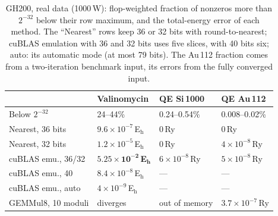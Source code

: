 \documentclass[conference]{IEEEtran}
\newcommand{\W}{\,W}
\newcommand{\Eh}{\,E$_\mathrm{h}$}
\newcommand{\Ry}{\,Ry}
\newcommand{\ee}[2]{#1{\times}10^{#2}}  %
\newcommand{\pct}{\%}
\begin{document}
\begin{table}[t]
\caption{GH200, real data (1000\W): flop-weighted fraction of nonzeros more than $2^{-32}$ below their row maximum, and the
total-energy error of each method. The ``Nearest'' rows keep 36 or 32 bits with round-to-nearest; cuBLAS emulation
with 36 and 32 bits uses five slices, with 40 bits six; auto: its automatic mode (at most 79 bits). The Au\,112
fraction comes from a two-iteration benchmark input, its errors from the fully converged input.}\label{tab:span}
\centering\footnotesize\setlength{\tabcolsep}{4pt}
\begin{tabular}{@{}llll@{}}
\toprule
& Valinomycin & QE Si\,1000 & QE Au\,112 \\
\midrule
Below $2^{-32}$ & 24--44\pct & 0.24--0.54\pct & 0.008--0.02\pct \\
Nearest, 36 bits & $\ee{9.6}{-7}$\Eh & 0\Ry & 0\Ry \\
Nearest, 32 bits & $\ee{1.2}{-5}$\Eh & 0\Ry & $\ee{4}{-8}$\Ry \\
cuBLAS emu., 36/32 & $\mathbf{\ee{5.25}{-2}}$\,\textbf{E}$_\mathbf{h}$ & $\ee{6}{-8}$\Ry & $\ee{5}{-8}$\Ry \\
cuBLAS emu., 40 & $\ee{8.4}{-8}$\Eh & --- & --- \\
cuBLAS emu., auto & $\ee{4}{-9}$\Eh & --- & --- \\
GEMMul8, 10 moduli & diverges & out of memory & $\ee{3.7}{-7}$\Ry \\
\bottomrule
\end{tabular}
\end{table}
\end{document}
